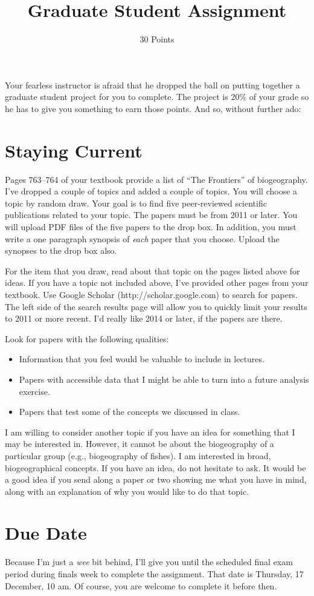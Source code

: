 \documentclass[11pt]{article}
\title{Graduate Student Assignment}
\author{30 Points}
\date{}                                           %
\begin{document}
\maketitle
\thispagestyle{plain}

Your fearless instructor is afraid that he dropped the ball on putting together a graduate student project for you to complete.  The project is 20\% of your grade so he has to give you something to earn those points.  And so, without further ado:

\section*{Staying Current}

Pages 763--764 of your textbook provide a list of ``The Frontiers'' of biogeography.  I've dropped a couple of topics and added a couple of topics. You will choose a topic by random draw. Your goal is to find five peer-reviewed scientific publications related to your topic.  The papers must be from 2011 or later.  You will upload PDF files of the five papers to the drop box. In addition, you must write a one paragraph synopsis of \textit{each} paper that you choose. Upload the synopses to the drop box also.

For the item that you draw, read about that topic on the pages listed above for ideas. If you have a topic not included above, I've provided other pages from your textbook. Use Google Scholar (http://scholar.google.com) to search for papers. The left side of the search results page will allow you to quickly limit your results to 2011 or more recent.  I'd really like 2014 or later, if the papers are there.

Look for papers with the following qualities:

\begin{itemize}

\item Information that you feel would be valuable to include in lectures.

\item Papers with accessible data that I might be able to turn into a future analysis exercise.

\item Papers that test some of the concepts we discussed in class.

\end{itemize}

I am willing to consider another topic if you have an idea for something that I may be interested in. However, it cannot be about the biogeography of a particular group (e.g., biogeography of fishes). I am interested in broad, biogeographical concepts.  If you have an idea, do not hesitate to ask. It would be a good idea if you send along a paper or two showing me what you have in mind, along with an explanation of why you would like to do that topic.

\section*{Due Date}

Because I'm just a \textit{wee} bit behind, I'll give you until the scheduled final exam period during finals week to complete the assignment. That date is Thursday, 17 December, 10 am. Of course, you are welcome to complete it before then.
\end{document}
